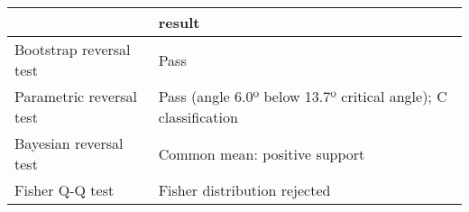 \begin{tabular}{ll}
\toprule
{} &                                                          result \\
\midrule
Bootstrap reversal test  &                                                            Pass \\
Parametric reversal test &  Pass (angle 6.0º below 13.7º critical angle); C classification \\
Bayesian reversal test   &                                   Common mean: positive support \\
Fisher Q-Q test          &                                    Fisher distribution rejected \\
\bottomrule
\end{tabular}
